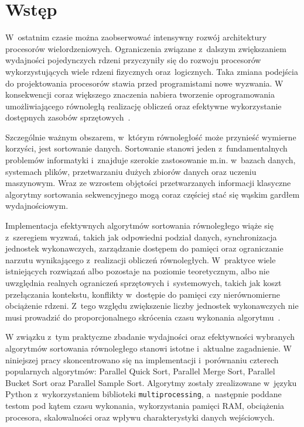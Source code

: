 \cleardoublepage
\chapter{Wstęp}
\label{cha:Wstep}


W~ostatnim czasie można zaobserwować intensywny rozwój architektury procesorów wielordzeniowych. Ograniczenia związane z~dalszym 
zwiększaniem wydajności pojedynczych rdzeni przyczyniły się do rozwoju procesorów wykorzystujących wiele rdzeni fizycznych oraz~logicznych. 
Taka zmiana podejścia do projektowania procesorów stawia przed programistami nowe wyzwania.
W konsekwencji coraz większego znaczenia nabiera tworzenie oprogramowania umożliwiającego równoległą realizację obliczeń
oraz efektywne wykorzystanie dostępnych zasobów sprzętowych~\cite{bib:Hennessy}.

Szczególnie ważnym obszarem, w~którym równoległość może przynieść wymierne korzyści, jest sortowanie danych. Sortowanie stanowi 
jeden z~fundamentalnych problemów informatyki i~znajduje szerokie zastosowanie m.in. w~bazach danych, systemach plików, 
przetwarzaniu dużych zbiorów danych oraz uczeniu maszynowym. Wraz ze wzrostem objętości przetwarzanych informacji klasyczne algorytmy 
sortowania sekwencyjnego mogą coraz częściej stać się wąskim gardłem wydajnościowym.

Implementacja efektywnych algorytmów sortowania równoległego wiąże się z~szeregiem wyzwań, takich jak odpowiedni podział danych,
synchronizacja jednostek wykonawczych, zarządzanie dostępem do pamięci oraz ograniczanie narzutu wynikającego z~realizacji obliczeń równoległych.
W~praktyce wiele istniejących rozwiązań albo pozostaje na poziomie teoretycznym, albo nie uwzględnia realnych ograniczeń sprzętowych 
i~systemowych, takich jak koszt przełączania kontekstu, konflikty w~dostępie do pamięci czy nierównomierne obciążenie rdzeni.
Z~tego względu zwiększenie liczby jednostek wykonawczych nie musi prowadzić do proporcjonalnego skrócenia czasu wykonania 
algorytmu~\cite{bib:Grama}.

W związku z~tym praktyczne zbadanie wydajności oraz efektywności wybranych algorytmów sortowania równoległego stanowi 
istotne i~aktualne zagadnienie. W niniejszej pracy skoncentrowano się na implementacji i~porównaniu czterech popularnych 
algorytmów: Parallel Quick Sort, Parallel Merge Sort, Parallel Bucket Sort oraz Parallel Sample Sort. 
Algorytmy zostały zrealizowane w~języku Python z~wykorzystaniem biblioteki \texttt{multiprocessing}, a~następnie poddane testom 
pod kątem czasu wykonania, wykorzystania pamięci RAM, obciążenia procesora, skalowalności oraz wpływu charakterystyki danych wejściowych.

